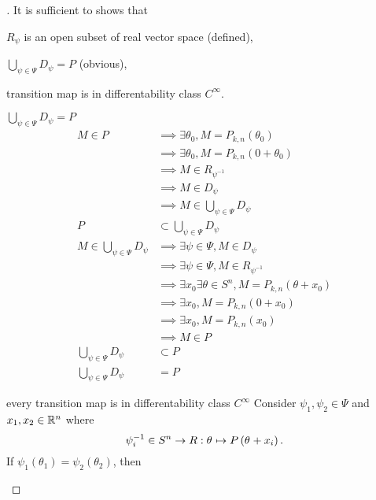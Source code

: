 \documentclass[stu, babel, american, biblatex, a4paper, leqno, draftall]{apa7}
\begin{document}
\begin{proof}[]
    It is sufficient to shows that
    \begin{APAenumerate}
        \item $R_\psi$ is an open subset of real vector space (defined),
        \item $\bigcup_{\psi\in\Psi} D_\psi = P$ (obvious),
        \item transition map is in differentability class $C^\infty$.
    \end{APAenumerate}
    \begin{subproof}{$\bigcup_{\psi\in\Psi} D_\psi = P$}
        \begin{align*}
            M \in P
            & \implies \exists \theta_0, M=P_{k,n}\left(\theta_0\right) \\
            & \implies \exists \theta_0, M=P_{k,n}\left(0 + \theta_0\right) \\
            & \implies M\in R_{\psi^{-1}} \\
            & \implies M\in D_{\psi} \\
            & \implies M\in \bigcup_{\psi\in\Psi} D_\psi \\
            P&\subset\bigcup_{\psi\in\Psi}D_\psi \\
            M\in \bigcup_{\psi\in\Psi} D_\psi
            & \implies \exists \psi\in\Psi, M\in D_\psi \\
            & \implies \exists \psi\in\Psi, M\in R_{\psi^{-1}} \\
            & \implies \exists x_0\exists\theta\in S^n, M=P_{k,n}\left(\theta+x_0\right) \\
            & \implies \exists x_0, M=P_{k,n}\left(0+x_0\right) \\
            & \implies \exists x_0, M=P_{k,n}\left(x_0\right) \\
            & \implies M \in P \\
            \bigcup_{\psi\in\Psi}D_\psi&\subset P \\
            \bigcup_{\psi\in\Psi} D_\psi &= P
        \end{align*}
    \end{subproof}
    \begin{subproof}{every transition map is in differentability class $C^\infty$}
        Consider $\psi_1, \psi_2 \in \Psi$ and $x_1, x_2 \in \mathbb{R}^n$ where
        \begin{equation*}
            \psi_i^{-1}
            \in S^n \to R
            :\tensor{\theta}{}\mapsto P\left(\tensor{\theta}{}+x_i\right)
            \text{.}
        \end{equation*}
        If $\psi_1\left(\theta_1\right)=\psi_2\left(\theta_2\right)$,
        then \skipped
    \end{subproof}
\end{proof}
\end{document}
